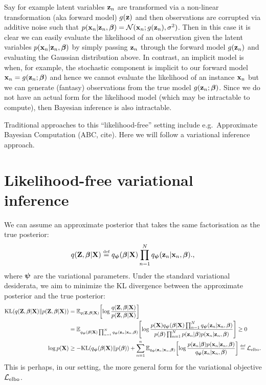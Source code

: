 \documentclass[12pt,a4page]{article}
\begin{document}
	Say for example latent variables $\z_n$ are transformed via a non-linear transformation (aka forward model) $g(\z)$ and then observations are  corrupted via additive noise such that $\condlike{n} = \Normal(\x_n; g(\z_n), \sigma^2)$.  
	Then in this case it is clear we can easily evaluate the likelihood of an observation given the latent variables $\condlike{n}$ by simply passing $\z_n$ through the forward model $g(\z_n)$ and evaluating the Gaussian distribution above. In contrast,  an implicit model is when, for example, the stochastic component is implicit to our forward model $\x_n = g(\z_n; \paramjoint)$ and hence we cannot evaluate the likelihood of an instance $\x_n$ but we  can generate (fantasy) observations from the true model $g(\z_n; \paramjoint)$. 
	Since we do not have an actual form for the likelihood model (which may be intractable to compute), then Bayesian inference is also intractable. 
	
	Traditional approaches to this ``likelihood-free'' setting include e.g.~Approximate Bayesian Computation (ABC, cite). Here we will follow a variational inference approach. 
	\section{Likelihood-free variational inference}
	We can assume an approximate posterior that takes the same factorisation as the true posterior:
	\begin{equation}
		\varjoint \defeq \varhyper \prod_{n=1}^N \varcond{n} \text{.,}
	\end{equation}
	where $\varparam$ are the variational parameters. 
	Under the standard variational desiderata, we aim to minimize the KL divergence between the approximate posterior and the true posterior:
	\begin{align}
		\kl{\varjoint}{\truejoint} &= \expectation{\varjoint}{\log \frac{\varjoint}{\truejoint}} \\
		&= \expectation{\varhyper \prod_{n=1}^N \varcond{n}}{\log \frac{ \marglike \varhyper \prod_{n=1}^N \varcond{n}}{\priorhyper \prod_{n=1}^{N} \prior{n} \condlike{n}}} \geq 0 \\
		\log \marglike & \geq  - \kl{\varhyper}{\priorhyper}  + \sum_{n=1}^{n} \expectation{\varcond{n}}{\log \frac{ \prior{n} \condlike{n} }{\varcond{n}} } \defeq \elbo. 
	\end{align}
	This is perhaps, in our setting, the more general form for the variational objective $\elbo$. 
\end{document}
